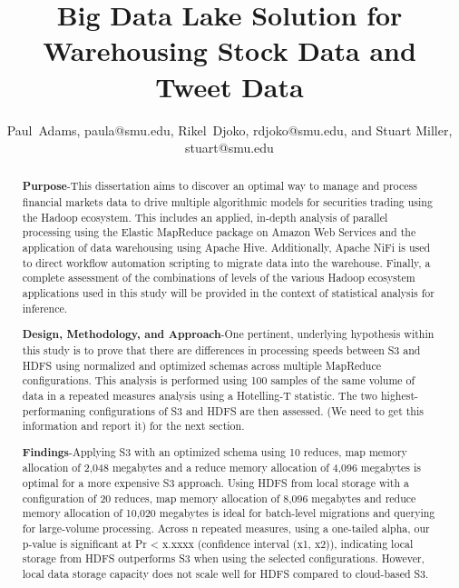 \documentclass[journal]{IEEEtran}
\begin{document}
\title{Big Data Lake Solution for\\ 
	Warehousing Stock Data and Tweet Data}

\author{Paul~Adams, paula@smu.edu,
        Rikel~Djoko, rdjoko@smu.edu,
        and Stuart Miller, stuart@smu.edu}%


\maketitle

\begin{abstract}
\textbf{Purpose}-This dissertation aims to discover an optimal way to manage and process financial markets data to drive multiple algorithmic models for securities trading using the Hadoop ecosystem. This includes an applied, in-depth analysis of parallel processing using the Elastic MapReduce package on Amazon Web Services and the application of data warehousing using Apache Hive. Additionally, Apache NiFi is used to direct workflow automation scripting to migrate data into the warehouse. Finally, a complete assessment of the combinations of levels of the various Hadoop ecosystem applications used in this study will be provided in the context of statistical analysis for inference.

\textbf{Design, Methodology, and Approach}-One pertinent, underlying hypothesis within this study is to prove that there are differences in processing speeds between S3 and HDFS using normalized and optimized schemas across multiple MapReduce configurations. This analysis is performed using 100 samples of the same volume of data in a repeated measures analysis using a Hotelling-T statistic. The two highest-performaning configurations of S3 and HDFS are then assessed. (We need to get this information and report it) for the next section.

\textbf{Findings}-Applying S3 with an optimized schema using 10 reduces, map memory allocation of 2,048 megabytes and a reduce memory allocation of 4,096 megabytes is optimal for a more expensive S3 approach. Using HDFS from local storage with a configuration of 20 reduces, map memory allocation of 8,096 megabytes and reduce memory allocation of 10,020 megabytes is ideal for batch-level migrations and querying for large-volume processing. Across n repeated measures, using a one-tailed alpha, our p-value is significant at Pr < x.xxxx (confidence interval (x1, x2)), indicating local storage from HDFS outperforms S3 when using the selected configurations. However, local data storage capacity does not scale well for HDFS compared to cloud-based S3.
\end{abstract}
\end{document}
